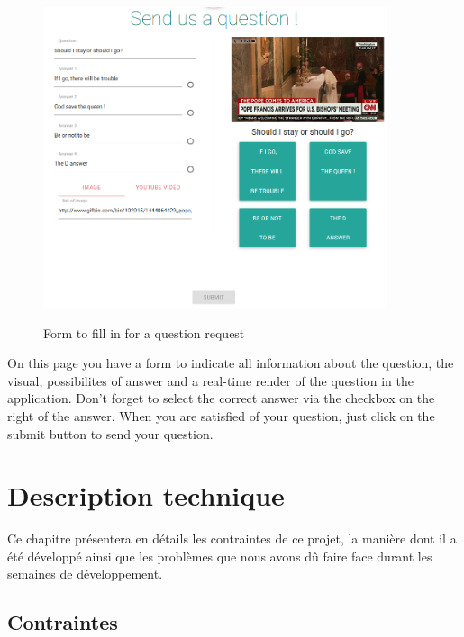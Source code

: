 \documentclass[a4paper,11pt, oneside]{book}
\begin{document}
\begin{figure} [htbp]
	\centering
	\includegraphics[width=0.9\textwidth]{CQuestion.png}\\
	\caption{Form to fill in for a question request}
\end{figure}

On this page you have a form to indicate all information about the question, the visual, possibilites of answer and a real-time render of the question in the application.
Don't forget to select the correct answer via the checkbox on the right of the answer. When you are satisfied of your question, just click on the submit button to send your question.

\newpage
\chapter{Description technique}

	Ce chapitre présentera en détails les contraintes de ce projet, la manière dont il a été développé ainsi que les problèmes que nous avons dû faire face
	durant les semaines de développement.

	\section{Contraintes}
\end{document}
